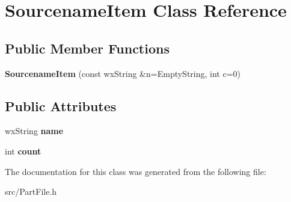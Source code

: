 \section{SourcenameItem Class Reference}
\label{classSourcenameItem}
\subsection*{Public Member Functions}
\begin{DoxyCompactItemize}
\item 
{\bfseries SourcenameItem} (const wxString \&n=EmptyString, int c=0)\label{classSourcenameItem_ad0ef1a82733a788a362aff20e2945c4e}

\end{DoxyCompactItemize}
\subsection*{Public Attributes}
\begin{DoxyCompactItemize}
\item 
wxString {\bfseries name}\label{classSourcenameItem_ae62a1185a94cf230916d8f9771554a6c}

\item 
int {\bfseries count}\label{classSourcenameItem_a98f772acbd131d76e10449cd550240da}

\end{DoxyCompactItemize}


The documentation for this class was generated from the following file:\begin{DoxyCompactItemize}
\item 
src/PartFile.h\end{DoxyCompactItemize}

